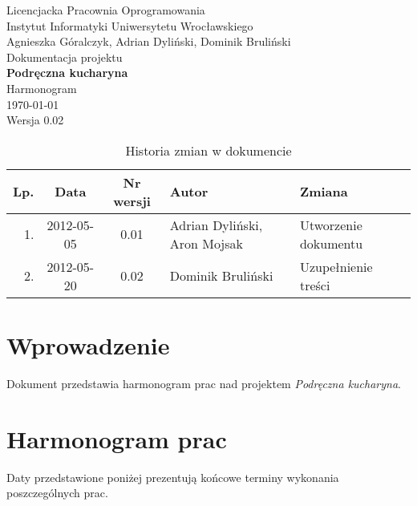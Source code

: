 \documentclass[12pt,leqno, twoside]{mwart}
\begin{document}
\thispagestyle{empty}
\begin{center}
Licencjacka Pracownia Oprogramowania \\ Instytut
Informatyki Uniwersytetu Wrocławskiego \\
\vspace{4cm}
\Large Agnieszka Góralczyk, Adrian Dyliński, Dominik Bruliński \\
\vspace{0.5cm}
\huge Dokumentacja projektu\\ \textbf{Podręczna kucharyna}\\ \Large Harmonogram\\
\vspace{1cm}
\normalsize \today \\
\vspace{2cm}
\normalsize Wersja 0.02
\end{center}

\newpage


\begin{table}
	\centering
	\caption{Historia zmian w dokumencie}
		\begin{tabular}{|r|c|c|l|l|}
		\hline
		Lp. & Data       & Nr wersji & Autor               & Zmiana \\ \hline
		1.   & 2012-05-05 & 0.01 & Adrian Dyliński, Aron Mojsak & Utworzenie dokumentu \\ \hline
		2.  & 2012-05-20 & 0.02 & Dominik Bruliński & Uzupełnienie treści \\ \hline
		\end{tabular}
\end{table}

\newpage

\tableofcontents
\newpage

\section{Wprowadzenie}
Dokument przedstawia harmonogram prac nad projektem \emph{Podręczna kucharyna}.

\section{Harmonogram prac}

Daty przedstawione poniżej prezentują końcowe terminy wykonania poszczególnych prac.
\end{document}
